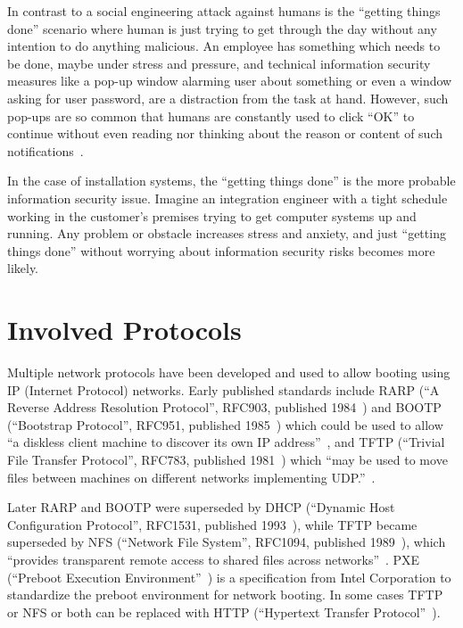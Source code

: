 In contrast to a social engineering attack against humans is the
``getting things done'' scenario where human is just trying to get
through the day without any intention to do anything malicious. An
employee has something which needs to be done, maybe under stress and
pressure, and technical information security measures like a pop-up
window alarming user about something or even a window asking for user
password, are a distraction from the task at hand. However, such
pop-ups are so common that humans are constantly used to click ``OK''
to continue without even reading nor thinking about the reason or
content of such notifications~\cite{anderson}.

In the case of installation systems, the ``getting things done'' is
the more probable information security issue. Imagine an integration
engineer with a tight schedule working in the customer's premises
trying to get computer systems up and running. Any problem or obstacle
increases stress and anxiety, and just ``getting things done'' without
worrying about information security risks becomes more likely.


\section{Involved Protocols}


Multiple network protocols have been developed and used to allow
booting using IP (Internet Protocol) networks. Early published
standards include RARP (``A Reverse Address Resolution Protocol'',
RFC903, published 1984~\cite{RFC903}) and BOOTP (``Bootstrap
Protocol'', RFC951, published 1985~\cite{RFC951}) which could be used
to allow ``a diskless client machine to discover its own IP
address''~\cite{RFC951}, and TFTP (``Trivial File Transfer Protocol'',
RFC783, published 1981~\cite{RFC783}) which ``may be used to move
files between machines on different networks implementing
UDP.''~\cite{RFC783}.

Later RARP and BOOTP were superseded by DHCP (``Dynamic Host
Configuration Protocol'', RFC1531, published 1993~\cite{RFC1531}),
while TFTP became superseded by NFS (``Network File System'', RFC1094,
published 1989~\cite{RFC1094}), which ``provides transparent remote
access to shared files across networks''~\cite{RFC1094}. PXE
(``Preboot Execution Environment''~\cite{PXEspec}) is a specification
from Intel Corporation to standardize the preboot environment for
network booting. In some cases TFTP or NFS or both can be replaced
with HTTP (``Hypertext Transfer
Protocol''~\cite{RFC1945}\cite{RFC2616}).


